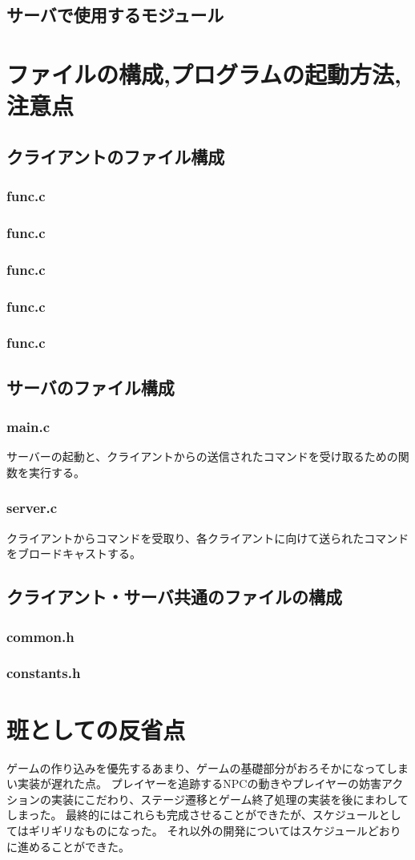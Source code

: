 \documentclass{jarticle}
\begin{document}
\subsection{サーバで使用するモジュール}

\section{ファイルの構成,プログラムの起動方法,注意点}
\subsection{クライアントのファイル構成}
\subsubsection{func.c}
\subsubsection{func.c}
\subsubsection{func.c}
\subsubsection{func.c}
\subsubsection{func.c}
\subsection{サーバのファイル構成}
\subsubsection{main.c}
サーバーの起動と、クライアントからの送信されたコマンドを受け取るための関数を実行する。
\subsubsection{server.c}
クライアントからコマンドを受取り、各クライアントに向けて送られたコマンドをブロードキャストする。

\subsection{クライアント・サーバ共通のファイルの構成}
\subsubsection{common.h}
\subsubsection{constants.h}

\section{班としての反省点} %
ゲームの作り込みを優先するあまり、ゲームの基礎部分がおろそかになってしまい実装が遅れた点。
プレイヤーを追跡するNPCの動きやプレイヤーの妨害アクションの実装にこだわり、ステージ遷移とゲーム終了処理の実装を後にまわしてしまった。
最終的にはこれらも完成させることができたが、スケジュールとしてはギリギリなものになった。
それ以外の開発についてはスケジュールどおりに進めることができた。
\end{document}
